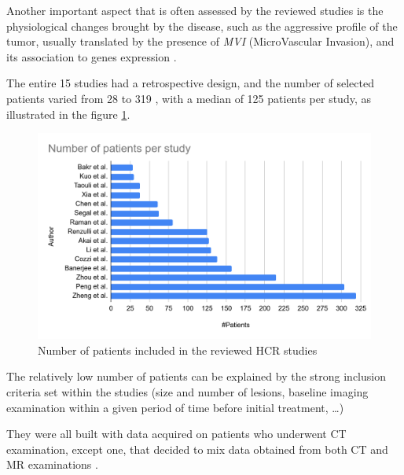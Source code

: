 \documentclass[]{article}
\begin{document}
Another important aspect that is often assessed by the reviewed studies
is the physiological changes brought by the disease, such as the
aggressive profile of the tumor, usually translated by the presence of
\emph{MVI} (MicroVascular Invasion), and its association to genes
expression \cite{Kuo2007,Banerjee2015,Renzulli2016,Segal2007,Peng2018,Bakr2017,Taouli2017}.

The entire 15 studies had a retrospective design, and the number of
selected patients varied from 28 \cite{Bakr2017} to 319
\cite{Zheng2018}, with a median of 125 patients per study, as illustrated in the figure \ref{HCR_studies_number_of_patients}.


\begin{figure}[th!]
	\centering
	\includegraphics[width=0.7\linewidth]{images/image2}
	\caption{Number of patients included in the reviewed HCR studies}
	\label{HCR_studies_number_of_patients}
\end{figure}



The relatively low number of patients can be explained by the strong
inclusion criteria set within the studies (size and number of lesions,
baseline imaging examination within a given period of time before
initial treatment, \ldots{})

They were all built with data acquired on patients who underwent CT
examination, except one, that decided to mix data obtained from both CT
and MR examinations \cite{Taouli2017}.
\end{document}
